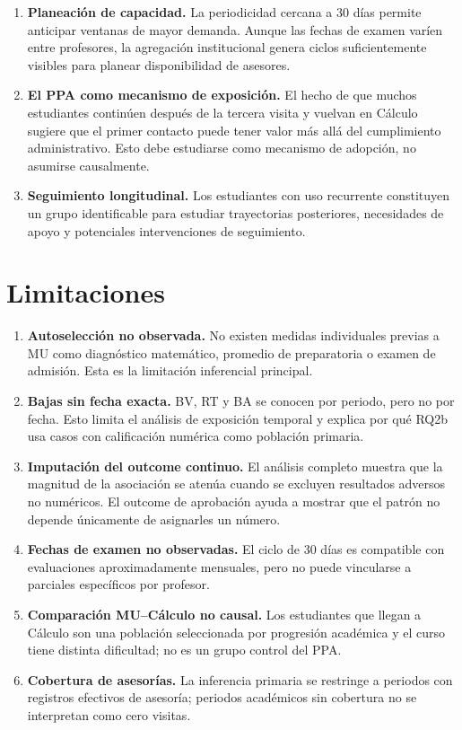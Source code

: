 \documentclass[11pt,letterpaper]{article}
\begin{document}
\begin{enumerate}[leftmargin=*]
\item \textbf{Planeación de capacidad.} La periodicidad cercana a 30 días permite anticipar ventanas de mayor demanda. Aunque las fechas de examen varíen entre profesores, la agregación institucional genera ciclos suficientemente visibles para planear disponibilidad de asesores.
\item \textbf{El PPA como mecanismo de exposición.} El hecho de que muchos estudiantes continúen después de la tercera visita y vuelvan en Cálculo sugiere que el primer contacto puede tener valor más allá del cumplimiento administrativo. Esto debe estudiarse como mecanismo de adopción, no asumirse causalmente.
\item \textbf{Seguimiento longitudinal.} Los estudiantes con uso recurrente constituyen un grupo identificable para estudiar trayectorias posteriores, necesidades de apoyo y potenciales intervenciones de seguimiento.
\end{enumerate}

\section{Limitaciones}

\begin{enumerate}[leftmargin=*]
\item \textbf{Autoselección no observada.} No existen medidas individuales previas a MU como diagnóstico matemático, promedio de preparatoria o examen de admisión. Esta es la limitación inferencial principal.
\item \textbf{Bajas sin fecha exacta.} BV, RT y BA se conocen por periodo, pero no por fecha. Esto limita el análisis de exposición temporal y explica por qué RQ2b usa casos con calificación numérica como población primaria.
\item \textbf{Imputación del outcome continuo.} El análisis completo muestra que la magnitud de la asociación se atenúa cuando se excluyen resultados adversos no numéricos. El outcome de aprobación ayuda a mostrar que el patrón no depende únicamente de asignarles un número.
\item \textbf{Fechas de examen no observadas.} El ciclo de 30 días es compatible con evaluaciones aproximadamente mensuales, pero no puede vincularse a parciales específicos por profesor.
\item \textbf{Comparación MU--Cálculo no causal.} Los estudiantes que llegan a Cálculo son una población seleccionada por progresión académica y el curso tiene distinta dificultad; no es un grupo control del PPA.
\item \textbf{Cobertura de asesorías.} La inferencia primaria se restringe a periodos con registros efectivos de asesoría; periodos académicos sin cobertura no se interpretan como cero visitas.
\end{enumerate}
\end{document}
